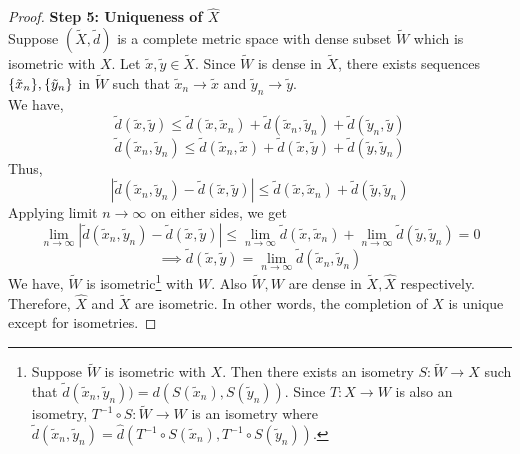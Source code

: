 \begin{proof}
	\textbf{Step 5: Uniqueness of $\hat{X}$}\\
	Suppose $(\tilde{X},\tilde{d})$ is a complete metric space with dense subset $\tilde{W}$ which is isometric with $X$.
	Let $\tilde{x},\tilde{y} \in \tilde{X}$.
	Since $\tilde{W}$ is dense in $\tilde{X}$, there exists sequences $\{\tilde{x}_n\},\{\tilde{y}_n\}$ in $\tilde{W}$ such that $\tilde{x}_n \to \tilde{x}$ and $\tilde{y}_n \to \tilde{y}$.\\
	We have,
	$$ \tilde{d}(\tilde{x},\tilde{y}) \le \tilde{d}(\tilde{x},\tilde{x}_n) + \tilde{d}(\tilde{x}_n,\tilde{y}_n) + \tilde{d}(\tilde{y}_n,\tilde{y}) $$
	$$ \tilde{d}(\tilde{x}_n,\tilde{y}_n) \le \tilde{d}(\tilde{x}_n,\tilde{x}) + \tilde{d}(\tilde{x},\tilde{y}) + \tilde{d}(\tilde{y},\tilde{y}_n) $$
	Thus,
	$$ | \tilde{d}(\tilde{x}_n,\tilde{y}_n) - \tilde{d}(\tilde{x},\tilde{y}) | \le \tilde{d}(\tilde{x},\tilde{x}_n) + \tilde{d}(\tilde{y},\tilde{y}_n) $$
	Applying limit $n \to \infty$ on either sides, we get
	$$ \lim_{n \to \infty} | \tilde{d}(\tilde{x}_n,\tilde{y}_n) - \tilde{d}(\tilde{x},\tilde{y}) | \le \lim_{n \to \infty} \tilde{d}(\tilde{x},\tilde{x}_n) + \lim_{n \to \infty} \tilde{d}(\tilde{y},\tilde{y}_n) = 0 $$
	$$ \implies \tilde{d}(\tilde{x},\tilde{y}) = \lim_{n \to \infty} \tilde{d}(\tilde{x}_n,\tilde{y}_n) $$
	We have, $\tilde{W}$ is isometric\dag\footnote{
		Suppose $\tilde{W}$ is isometric with $X$.
		Then there exists an isometry $S : \tilde{W} \to X$ such that $\tilde{d}(\tilde{x}_n,\tilde{y}_n)) = d(S(\tilde{x}_n),S(\tilde{y}_n))$.
		Since $T : X \to W$ is also an isometry, $T^{-1} \circ S : \tilde{W} \to W$ is an isometry where $\tilde{d}(\tilde{x}_n,\tilde{y}_n) = \hat{d}(T^{-1}\circ S(\tilde{x}_n), T^{-1}\circ S(\tilde{y}_n)).$}
		with $W$.
	Also $\tilde{W},W$ are dense in $\tilde{X},\hat{X}$ respectively.
	Therefore, $\hat{X}$ and $\tilde{X}$ are isometric.
	In other words, the completion of $X$ is unique except for isometries.
\end{proof}

